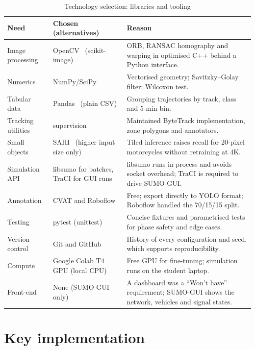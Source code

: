 \begin{table}[htbp]
\centering
\caption{Technology selection: libraries and tooling}\label{tab:impl-tech-libs}
\small
\begin{tabularx}{\textwidth}{@{}>{\raggedright\arraybackslash}p{2.6cm}>{\raggedright\arraybackslash}p{3.6cm}>{\raggedright\arraybackslash}X@{}}
\toprule
Need & Chosen (alternatives) & Reason\\
\midrule
Image processing & OpenCV~\cite{bradski2000opencv} (scikit-image) & ORB, RANSAC homography and warping in optimised C++ behind a Python interface.\\
Numerics & NumPy/SciPy~\cite{harris2020numpy,virtanen2020scipy} & Vectorised geometry; Savitzky--Golay filter; Wilcoxon test.\\
Tabular data & Pandas~\cite{mckinney2010pandas} (plain CSV) & Grouping trajectories by track, class and 5-min bin.\\
Tracking utilities & supervision~\cite{roboflow_supervision} & Maintained ByteTrack implementation, zone polygons and annotators.\\
Small objects & SAHI~\cite{akyon2022sahi} (higher input size only) & Tiled inference raises recall for 20-pixel motorcycles without retraining at 4K.\\
Simulation API & libsumo for batches, TraCI for GUI runs & libsumo runs in-process and avoids socket overhead; TraCI is required to drive SUMO-GUI.\\
Annotation & CVAT and Roboflow & Free; export directly to YOLO format; Roboflow handled the 70/15/15 split.\\
Testing & pytest (unittest) & Concise fixtures and parametrised tests for phase safety and edge cases.\\
Version control & Git and GitHub & History of every configuration and seed, which supports reproducibility.\\
Compute & Google Colab T4 GPU (local CPU) & Free GPU for fine-tuning; simulation runs on the student laptop.\\
Front-end & None (SUMO-GUI only) & A dashboard was a ``Won't have'' requirement; SUMO-GUI shows the network, vehicles and signal states.\\
\bottomrule
\end{tabularx}
\end{table}

\section{Key implementation}\label{sec:impl-key}

